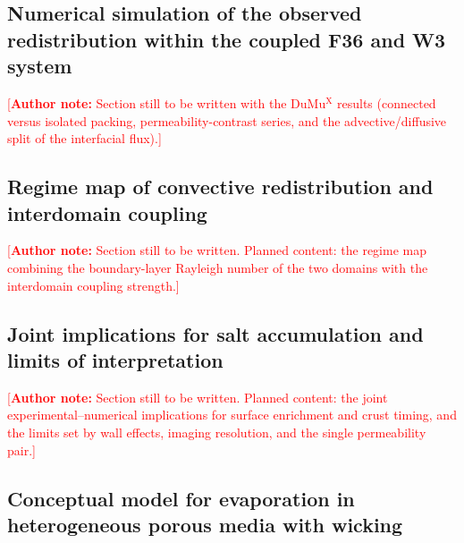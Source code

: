 \documentclass[final]{agujournal2019}
\newcommand{\authornote}[1]{%
  \par\noindent\textcolor{red}{\small[\textbf{Author note:} #1]}\par}
\begin{document}
\subsection{Numerical simulation of the observed redistribution within the coupled
F36 and W3 system} \label{sec:numerical-results}

\authornote{Section still to be written with the DuMu$^\mathrm{X}$ results
(connected versus isolated packing, permeability-contrast series, and the
advective/diffusive split of the interfacial flux).}

\subsection{Regime map of convective redistribution and interdomain coupling}
\label{sec:regime-map}

\authornote{Section still to be written. Planned content: the regime map
combining the boundary-layer Rayleigh number of the two domains with the
interdomain coupling strength.}

\subsection{Joint implications for salt accumulation and limits of
interpretation} \label{sec:implications}

\authornote{Section still to be written. Planned content: the joint
experimental--numerical implications for surface enrichment and crust timing, and
the limits set by wall effects, imaging resolution, and the single
permeability pair.}

\subsection{Conceptual model for evaporation in heterogeneous porous media with
wicking} \label{sec:conceptual}
\end{document}
